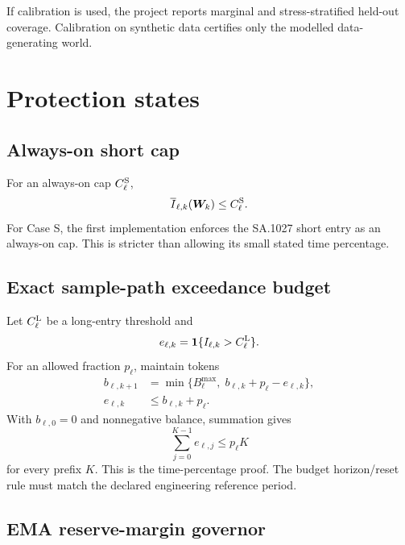 \documentclass[11pt]{article}
\newcommand{\W}{\bm W}
\begin{document}
If calibration is used, the project reports marginal and stress-stratified held-out coverage. Calibration on synthetic data certifies only the modelled data-generating world.

\section{Protection states}

\subsection{Always-on short cap}

For an always-on cap $C_\ell^{\rm S}$,
\begin{equation}
 \overline I_{\ell,k}(\W_k)\le C_\ell^{\rm S}.
 \label{eq:short}
\end{equation}
For Case S, the first implementation enforces the SA.1027 short entry as an always-on cap. This is stricter than allowing its small stated time percentage.

\subsection{Exact sample-path exceedance budget}

Let $C_\ell^{\rm L}$ be a long-entry threshold and
\begin{equation}
 e_{\ell,k}=\mathbf 1\{I_{\ell,k}>C_\ell^{\rm L}\}.
\end{equation}
For an allowed fraction $p_\ell$, maintain tokens
\begin{align}
 b_{\ell,k+1}&=\min\{B_\ell^{\max},\;b_{\ell,k}+p_\ell-e_{\ell,k}\},\\
 e_{\ell,k}&\le b_{\ell,k}+p_\ell.
 \label{eq:token}
\end{align}
With $b_{\ell,0}=0$ and nonnegative balance, summation gives
\begin{equation}
 \sum_{j=0}^{K-1}e_{\ell,j}\le p_\ell K
\end{equation}
for every prefix $K$. This is the time-percentage proof. The budget horizon/reset rule must match the declared engineering reference period.

\subsection{EMA reserve-margin governor}
\end{document}
